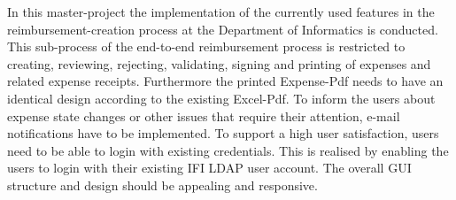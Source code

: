 In this master-project the implementation of the currently used features in the reimbursement-creation process at the Department of Informatics is conducted. This sub-process of the end-to-end reimbursement process is restricted to creating, reviewing, rejecting, validating, signing and printing of expenses and related expense receipts. Furthermore the printed Expense-Pdf needs to have an identical design according to the existing Excel-Pdf. To inform the users about expense state changes or other issues that require their attention, e-mail notifications have to be implemented. To support a high user satisfaction, users need to be able to login with existing credentials. This is realised by enabling the users to login with their existing IFI LDAP user account. The overall GUI structure and design should be appealing and responsive.